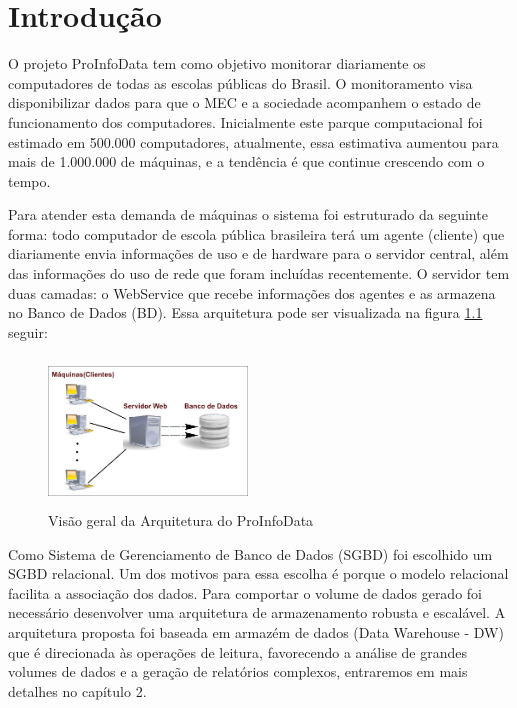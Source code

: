 \chapter{\textbf{Introdução}}
\label{Introducao}
O projeto ProInfoData tem como objetivo monitorar diariamente os computadores de
todas as escolas públicas do Brasil. O monitoramento visa disponibilizar dados
para que o MEC e a sociedade acompanhem o estado de funcionamento dos
computadores. Inicialmente este parque computacional foi estimado em 500.000
computadores, atualmente, essa estimativa aumentou para mais de 1.000.000 de
máquinas, e a tendência é que continue crescendo com o tempo.
 
Para atender esta demanda de máquinas o sistema foi estruturado da
seguinte forma: todo computador de escola pública brasileira terá um agente (cliente)
que diariamente envia informações de uso e de hardware para o servidor central,
além das informações do uso de rede que foram incluídas recentemente. O servidor
tem duas camadas: o WebService que recebe informações dos agentes e as armazena
no Banco de Dados (BD). Essa arquitetura pode ser visualizada na figura \ref{arquiteturaBD}
seguir:\newline

\begin{figure}[ht]
  \centering
  \includegraphics[width=200px,height=150px]{img/arq-bd.png}
  \caption{Visão geral da Arquitetura do ProInfoData}
  \label{arquiteturaBD}
\end{figure}

Como Sistema de Gerenciamento de Banco de Dados (SGBD) foi escolhido um SGBD
relacional. Um dos motivos para essa escolha é porque o modelo relacional facilita
a associação dos dados. Para comportar o volume de dados gerado foi necessário
desenvolver uma arquitetura de armazenamento robusta e escalável. A arquitetura
proposta foi baseada em armazém de dados (Data Warehouse - DW) que é direcionada
às operações de leitura, favorecendo a análise de grandes volumes de dados e a
geração de relatórios complexos, entraremos em mais detalhes no capítulo 2.

